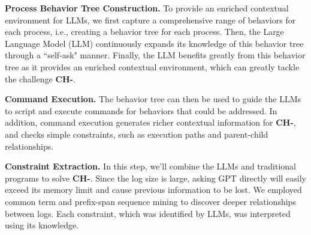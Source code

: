 \noindent
{\bf Process Behavior Tree Construction.} To provide an enriched contextual environment for LLMs, we first capture a comprehensive range of behaviors for each process, i.e., creating a behavior tree for each process. Then, the Large Language Model (LLM) continuously expands its knowledge of this behavior tree through a ``self-ask" manner. Finally, the LLM benefits greatly from this behavior tree as it provides an enriched contextual environment, which can greatly tackle the challenge {\bf CH-}.

\noindent
{\bf Command Execution.} The behavior tree can then be used to guide the LLMs to script and execute commands for behaviors that could be addressed. In addition, command execution generates richer contextual information for {\bf CH-}, and checks simple constraints, such as execution paths and parent-child relationships. 

\noindent
{\bf Constraint Extraction.} In this step, we'll combine the LLMs and traditional programs to solve {\bf CH-}. Since the log size is large, asking GPT directly will easily exceed its memory limit and cause previous information to be lost. We employed common term and prefix-span sequence mining to discover deeper relationships between logs. Each constraint, which was identified by LLMs, was interpreted using its knowledge. 

